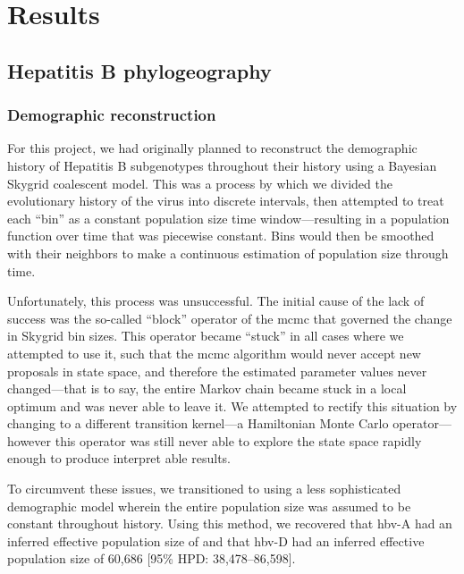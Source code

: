 \chapter{Results}\label{ch:results}

\section{Hepatitis B phylogeography}

\subsection{Demographic reconstruction}

For this project, we had originally planned to reconstruct the demographic history of Hepatitis B subgenotypes throughout their history using a Bayesian Skygrid coalescent model.
This was a process by which we divided the evolutionary history of the virus into discrete intervals, then attempted to treat each ``bin'' as a constant population size time window---resulting in a population function over time that was piecewise constant.
Bins would then be smoothed with their neighbors to make a continuous estimation of population size through time.


Unfortunately, this process was unsuccessful.
The initial cause of the lack of success was the so-called ``block'' operator of the \gls{mcmc} that governed the change in Skygrid bin sizes.
This operator became ``stuck'' in all cases where we attempted to use it, such that the \gls{mcmc} algorithm would never accept new proposals in state space, and therefore the estimated parameter values never changed---that is to say, the entire Markov chain became stuck in a local optimum and was never able to leave it.
We attempted to rectify this situation by changing to a different transition kernel---a Hamiltonian Monte Carlo operator---however this operator was still never able to explore the state space rapidly enough to produce interpret able results.

To circumvent these issues, we transitioned to using a less sophisticated demographic model wherein the entire population size was assumed to be constant throughout history.
Using this method, we recovered that \gls{hbv}-A had an inferred effective population size of  and that \gls{hbv}-D had an inferred effective population size of 60,686 [95\% HPD: 38,478--86,598].


